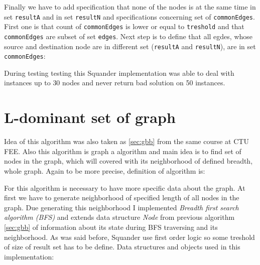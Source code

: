 \documentclass[11pt,twoside,a4paper]{book}
\begin{document}
Finally we have to add specification that none of the nodes is at the same time
in set \verb|resultA| and in set \verb|resultN| and specifications concerning
set of \verb|commonEdges|. First one is that count of \verb|commonEdges| is
lower or equal to \verb|treshold| and that \verb|commonEdges| are subset of set
\verb|edges|. Next step is to define that all egdes, whose source and
destination node are in different set (\verb|resultA| and \verb|resultN|), are
in set \verb|commonEdges|:



During testing testing this Squander implementation was able to deal with
instances up to $30$ nodes and never return bad solution on 50 instances.

\section{L-dominant set of graph}
\label{sec:ldsg}
Idea of this algorithm was also taken as \ref{sec:gbb} from the same course at
CTU FEE. Also this algorithm is graph a algorithm and main idea is to find set
of nodes in the graph, which will covered with its neighborhood of defined
breadth, whole graph. Again to be more precise, definition of algorithm is:

\begin{center}
\end{center}

For this algorithm is necessary to have more specific data about the graph. At
first we have to generate neighborhood of specified length of all nodes in the
graph. Due generating this neighborhood I implemented \textit{Breadth
first search algorithm (BFS)} and extends data structure \textit{Node} from
previous algorithm \ref{sec:gbb} of information about its state during BFS
traversing and its neighborhood. As was said before, Squander use first
order logic so some treshold of size of result set has to be define. Data
structures and objects used in this implementation:
\end{document}
